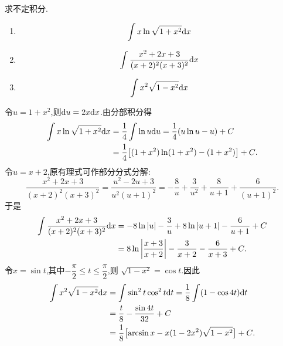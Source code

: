 \documentclass{ctexart}
\begin{document}
\begin{problem}[5.(18\songti{分})]
求不定积分.
\begin{enumerate}[label=\tbf{(\alph*)},leftmargin=*,topsep=0pt,parsep=0pt,itemsep=0pt,partopsep=0pt]
\item \[\int x\ln\sqrt{1+x^2}\mathrm{d} x\]
\item \[\int\dfrac{x^2+2x+3}{(x+2)^2(x+3)^2}\mathrm{d} x\]
\item \[\int x^2\sqrt{1-x^2}\mathrm{d} x\]
\end{enumerate}
\end{problem}
\begin{solution}
 令$u=1+x^2$,则$\mathrm{d} u=2x\mathrm{d} x$.由分部积分得
\[
\begin{aligned}
\int x\ln\sqrt{1+x^2}\mathrm{d} x
&=\dfrac14\int\ln u\mathrm{d} u
=\dfrac14(u\ln u-u)+C\\
&={\dfrac14\bigl[(1+x^2)\ln(1+x^2)-(1+x^2)\bigr]+C}.
\end{aligned}
\]
 令$u=x+2$,原有理式可作部分分式分解:
\[
\dfrac{x^2+2x+3}{(x+2)^2(x+3)^2}
=\dfrac{u^2-2u+3}{u^2(u+1)^2}
=-\dfrac8u+\dfrac3{u^2}+\dfrac8{u+1}+\dfrac6{(u+1)^2}.
\]
于是
\[
\begin{aligned}
\int\dfrac{x^2+2x+3}{(x+2)^2(x+3)^2}\mathrm{d} x
&=-8\ln|u|-\dfrac3u+8\ln|u+1|-\dfrac6{u+1}+C\\
&={8\ln\left|\dfrac{x+3}{x+2}\right|
-\dfrac3{x+2}-\dfrac6{x+3}+C}.
\end{aligned}
\]
 令$x=\sin t$,其中$-\dfrac\pi2\leqslant t\leqslant\dfrac\pi2$,则
$\sqrt{1-x^2}=\cos t$.因此
\[
\begin{aligned}
\int x^2\sqrt{1-x^2}\mathrm{d} x
&=\int\sin^2t\cos^2t\mathrm{d} t
=\dfrac18\int(1-\cos4t)\mathrm{d} t\\
&=\dfrac t8-\dfrac{\sin4t}{32}+C\\
&={\dfrac18\bigl[\arcsin x-x(1-2x^2)\sqrt{1-x^2}\bigr]+C}.
\end{aligned}
\]
\end{solution}
\end{document}
